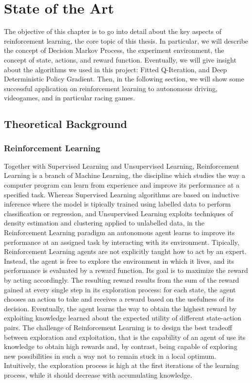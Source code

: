 \chapter{State of the Art}
\label{State of the Art}
\thispagestyle{empty}


The objective of this chapter is to go into detail about the key aspects of reinforcement learning, the core topic of this thesis. In particular, we will describe the concept of Decision Markov Process, the experiment environment, the concept of state, actions, and reward function. Eventually, we will give insight about the algorithms we used in this project: Fitted Q-Iteration, and Deep Deterministic Policy Gradient. 
Then, in the following section, we will show some successful application on reinforcement learning to autonomous driving, videogames, and in particular racing games.

\section{Theoretical Background}

\subsection{Reinforcement Learning}
Together with Supervised Learning and Unsupervised Learning, Reinforcement Learning is a branch of Machine Learning, the discipline which studies the way a computer program can learn from experience and improve its performance at a specified task. Whereas Supervised Learning algorithms are based on inductive inference where the model is tipically trained using labelled data to perform classification or regression, and Unsupervised Learning exploits techniques of density estimation and clustering applied to unlabelled data, in the Reinforcement Learning paradigm an autonomous agent learns to improve its performance at an assigned task by interacting with its environment.
Tipically, Reinforcement Learning agents are not explicitly taught how to act by an expert. Instead, the agent is free to explore the environment in which it lives, and its performance is evaluated by a reward function. Its goal is to maximize the reward by acting accordingly. The resulting reward results from the sum of the reward gained at every single step in its exploration process: for each state, the agent chooses an action to take and receives a reward based on the usefulness of its decision. Eventually, the agent learns the way to obtain the highest reward by exploiting knowledge learned about the expected utility of different state-action pairs. The challenge of Reinforcement Learning is to design the best tradeoff between exploration and exploitation, that is the capability of an agent of use its knowledge to obtain high rewards and, by contrast, being capable of exploring new possibilities in such a way not to remain stuck in a local optimum. Intuitively, the exploration process is high at the first iterations of the learning process, while it should decrease with accumulating knowledge.

